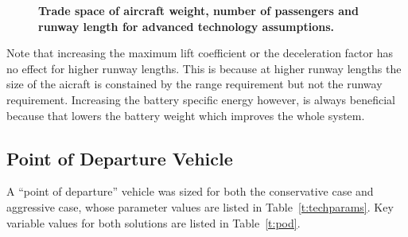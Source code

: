 \documentclass[]{aiaa-tc}%
\begin{document}
\begin{figure}[h!]
\begin{subfigmatrix}{3}
 \end{subfigmatrix}
    \caption{\textbf{Trade space of aircraft weight, number of passengers and runway length for advanced technology assumptions.}}
 \label{f:tech}
\end{figure}

Note that increasing the maximum lift coefficient or the deceleration factor has no effect for higher runway lengths.  
This is because at higher runway lengths the size of the aicraft is constained by the range requirement but not the runway requirement. 
Increasing the battery specific energy however, is always beneficial because that lowers the battery weight which improves the whole system. 

\subsection{Point of Departure Vehicle}

A ``point of departure'' vehicle was sized for both the conservative case and aggressive case, whose parameter values are listed in Table~\ref{t:techparams}.  
Key variable values for both solutions are listed in Table~\ref{t:pod}.
\end{document}
